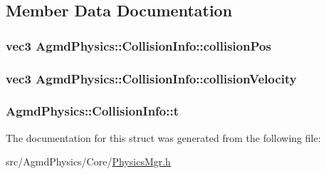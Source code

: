 \subsection{Member Data Documentation}
\hypertarget{struct_agmd_physics_1_1_collision_info_ada9c764700fcc82da541de40e6373ab0}{
\subsubsection[{collision\+Pos}]{\setlength{\rightskip}{0pt plus 5cm}vec3 Agmd\+Physics\+::\+Collision\+Info\+::collision\+Pos}}\label{struct_agmd_physics_1_1_collision_info_ada9c764700fcc82da541de40e6373ab0}
\hypertarget{struct_agmd_physics_1_1_collision_info_a7be0279a10a58a8daff8a578afa309de}{
\subsubsection[{collision\+Velocity}]{\setlength{\rightskip}{0pt plus 5cm}vec3 Agmd\+Physics\+::\+Collision\+Info\+::collision\+Velocity}}\label{struct_agmd_physics_1_1_collision_info_a7be0279a10a58a8daff8a578afa309de}
\hypertarget{struct_agmd_physics_1_1_collision_info_afd1363c63af98df5a8ba01a09ff6392e}{
\subsubsection[{t}]{ Agmd\+Physics\+::\+Collision\+Info\+::t}}\label{struct_agmd_physics_1_1_collision_info_afd1363c63af98df5a8ba01a09ff6392e}


The documentation for this struct was generated from the following file\+:\begin{DoxyCompactItemize}
\item 
src/\+Agmd\+Physics/\+Core/\hyperlink{_agmd_physics_2_core_2_physics_mgr_8h}{Physics\+Mgr.\+h}\end{DoxyCompactItemize}
